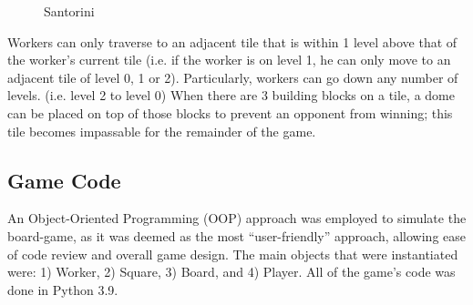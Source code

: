 \documentclass[a4paper,12pt,table]{article}
\begin{document}
\begin{figure}[H]
    \centering
    \qquad
    \caption{Santorini}
    \label{fig:}
\end{figure}

Workers can only traverse to an adjacent tile that is within 1 level above that of the worker’s current tile (i.e. if the worker is on level 1, he can only move to an adjacent tile of level 0, 1 or 2). Particularly, workers can go down any number of levels. (i.e. level 2 to level 0) When there are 3 building blocks on a tile, a dome can be placed on top of those blocks to prevent an opponent from winning; this tile becomes impassable for the remainder of the game. \par

\subsection{Game Code}

An Object-Oriented Programming (OOP) approach was employed to simulate the board-game, as it was deemed as the most “user-friendly” approach, allowing ease of code review and overall game design. The main objects that were instantiated were: 1) Worker, 2) Square, 3) Board, and 4) Player. All of the game’s code was done in Python 3.9. \par
\end{document}

